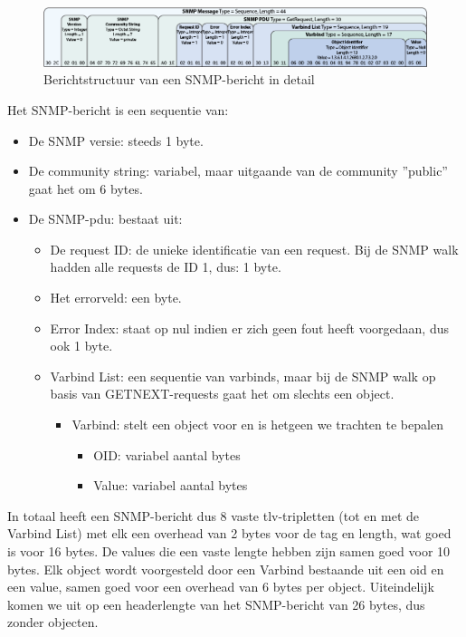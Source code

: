 \begin{figure}[h]
	\centering
	\includegraphics[scale=0.40]{figures/snmp/berichtstructuur-3}
	\caption[Berichtstructuur van een SNMP-bericht in detail]{Berichtstructuur van een SNMP-bericht in detail\cite{snmp-message-format}}
	\label{fig-berichtstructuur-4}
\end{figure}

Het SNMP-bericht is een sequentie van:

\begin{itemize}
	\item De SNMP versie: steeds 1 byte.
	\item De community string: variabel, maar uitgaande van de community ''public'' gaat het om 6 bytes.
	\item De SNMP-\gls{pdu}: bestaat uit:
		\begin{itemize}
			\item De request ID: de unieke identificatie van een request.
				Bij de SNMP walk hadden alle requests de ID 1, dus: 1 byte.
			\item Het errorveld: een byte.
			\item Error Index: staat op nul indien er zich geen fout heeft voorgedaan, dus ook 1 byte.
			\item Varbind List: een sequentie van varbinds, maar bij de SNMP walk op basis van GETNEXT-requests gaat het om slechts een object.
				\begin{itemize}
					\item Varbind: stelt een object voor en is hetgeen we trachten te bepalen
						\begin{itemize}
							\item OID: variabel aantal bytes
							\item Value: variabel aantal bytes
						\end{itemize}
				\end{itemize}
		\end{itemize}
\end{itemize}

In totaal heeft een SNMP-bericht dus 8 vaste \gls{tlv}-tripletten (tot en met de Varbind List) met elk een overhead van 2 bytes voor de tag en length,
wat goed is voor 16 bytes.
De values die een vaste lengte hebben zijn samen goed voor 10 bytes.
Elk object wordt voorgesteld door een Varbind bestaande uit een \gls{oid} en een value, samen goed voor een overhead van 6 bytes per object.
Uiteindelijk komen we uit op een headerlengte van het SNMP-bericht van 26 bytes, dus zonder objecten.

